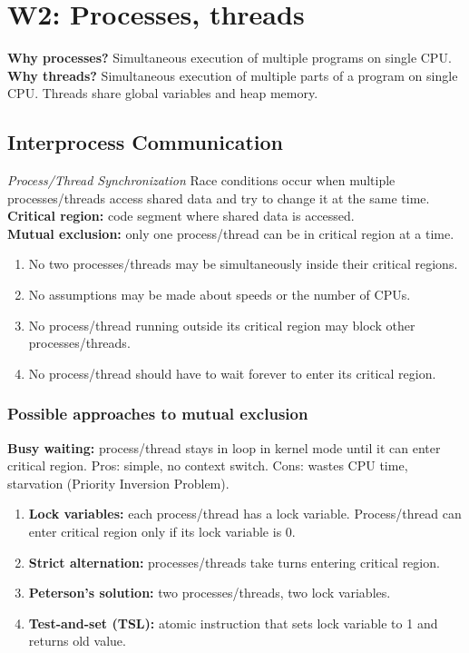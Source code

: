 \section{W2: Processes, threads}
\textbf{Why processes?} Simultaneous execution of multiple programs on single CPU.\\
\textbf{Why threads?} Simultaneous execution of multiple parts of a program on single CPU. Threads share global variables and heap memory.\\

\subsection{Interprocess Communication}
\textit{Process/Thread Synchronization} Race conditions occur when multiple processes/threads access shared data and try to change it at the same time.\\
\textbf{Critical region:} code segment where shared data is accessed.\\
\textbf{Mutual exclusion:} only one process/thread can be in critical region at a time.\\
\begin{enumerate}
    \item No two processes/threads may be simultaneously inside their critical regions.
    \item No assumptions may be made about speeds or the number of CPUs.
    \item No process/thread running outside its critical region may block other processes/threads.
    \item No process/thread should have to wait forever to enter its critical region.
\end{enumerate}

\subsubsection{Possible approaches to mutual exclusion}
\textbf{Busy waiting:} process/thread stays in loop in kernel mode until it can enter critical region. Pros: simple, no context switch. Cons: wastes CPU time, starvation (Priority Inversion Problem).\\
\begin{enumerate}
    \item \textbf{Lock variables:} each process/thread has a lock variable. Process/thread can enter critical region only if its lock variable is 0.\\
    \item \textbf{Strict alternation:} processes/threads take turns entering critical region.\\
    \item \textbf{Peterson's solution:} two processes/threads, two lock variables.\\
    \item \textbf{Test-and-set (TSL):} atomic instruction that sets lock variable to 1 and returns old value.\\
\end{enumerate}


